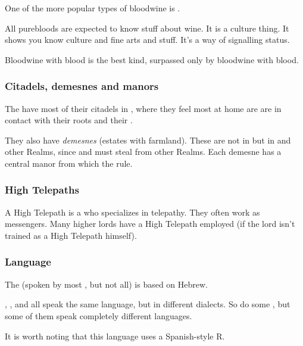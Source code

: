 One of the more popular types of bloodwine is \ethylshe. 

All \resphan{} purebloods are expected to know stuff about wine. 
It is a culture thing. 
It shows you know culture and fine arts and stuff. 
It's a way of signalling status. 

Bloodwine with \resphan{} blood is the best kind, surpassed only by bloodwine with \draconic{} blood. 





\subsubsection{Citadels, demesnes and manors}
The \resphain{} have most of their citadels in , where they feel most at home are are in contact with their roots and their . 

They also have \emph{demesnes} (estates with farmland). 
These are not in \Nyx{} but in  and other  Realms, since  and must steal from other Realms. 
Each demesne has a central manor from which the \resphain{} rule. 






\subsubsection{High Telepaths}
A High Telepath is a \resphan{} who specializes in telepathy. 
They often work as messengers. 
Many higher \resphan{} lords have a High Telepath employed (if the lord isn't trained as a High Telepath himself). 





\subsubsection{Language}
The  (spoken by most \resphain, but not all) is based on Hebrew. 

\Mystraacht, \CiriathSepher, \TiphredSerah{} and \Kezerad{} all speak the same language, but in different dialects. 
So do some \Baelzerach, but some of them speak completely different languages. 

It is worth noting that this language uses a Spanish-style  R. 





